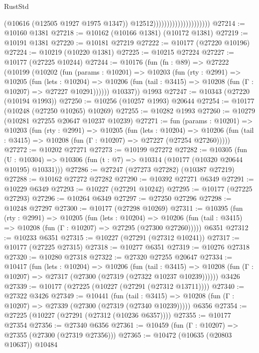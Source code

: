 \begin{lexlean}{RustStd}
\begin{coremodule}
                                              (@10616 (@12505 @1927 @1975 @1347))
                                              @12512)))))))))))))))))))))
@27214 := @10160 @1381
@27218 := @10162 (@10166 @1381) (@10172 @1381)
@27219 := @10191 @1381
@27220 := @10181 @27219
@27222 := @10177 (@27220 @10196)
@27224 := @10219 (@10220 @1381)
@27225 := @10215 @27224
@27227 := @10177 (@27225 @10244)
@27244 := @10176
    (fun (fn : @89) =>
    @27222
      (@10199
        (@10202
          (fun (params : @10201) =>
          @10203
            (fun (rty : @2991) =>
            @10205
              (fun (lets : @10204) =>
              @10206 (fun (tail : @3415) => @10208 (fun (Γ : @10207) => @27227 @10291))))))
        @10337))
    @1993
@27247 := @10343 (@27220 (@10194 @1993))
@27250 := @10256 (@10257 @1993) @20644
@27254 := @10177 (@10248 (@27250 @10265) @10269)
@27255 := @10282 @1993
@27260 := @10279 (@10281 @27255 @20647 @10237 @10239)
@27271 := fun (params : @10201) =>
  @10203
    (fun (rty : @2991) =>
    @10205
      (fun (lets : @10204) =>
      @10206 (fun (tail : @3415) => @10208 (fun (Γ : @10207) => @27227 (@27254 @27260)))))
@27272 := @10202 @27271
@27273 := @10199 @27272
@27282 := @10305
    (fun (U : @10304) => @10306 (fun (t : @7) => @10314 (@10177 (@10320 @20644 @10195) @10331)))
@27286 := @27247 (@27273 @27282) (@10387 @27219)
@27288 := @10162 @27272 @27282
@27290 := @10392 @27271 @6349
@27291 := @10229 @6349
@27293 := @10227 (@27291 @10242)
@27295 := @10177 (@27225 @27293)
@27296 := @10264 @6349
@27297 := @27250 @27296
@27298 := @10248 @27297
@27300 := @10177 (@27298 @10269)
@27311 := @10395
    (fun (rty : @2991) =>
    @10205
      (fun (lets : @10204) =>
      @10206 (fun (tail : @3415) => @10208 (fun (Γ : @10207) => @27295 (@27300 @27260)))))
    @6351
@27312 := @10233 @6351
@27315 := @10227 (@27291 (@27312 @10241))
@27317 := @10177 (@27225 @27315)
@27318 := @10277 @6351
@27319 := @10276 @27318
@27320 := @10280 @27318
@27322 := @27320 @27255 @20647
@27334 := @10417
    (fun (lets : @10204) =>
    @10206
      (fun (tail : @3415) =>
      @10208 (fun (Γ : @10207) => @27317 (@27300 (@27319 (@27322 @10237 @10239))))))
    @3426
@27339 := @10177 (@27225 (@10227 (@27291 (@27312 @13711))))
@27340 := @27322 @3426
@27349 := @10441
    (fun (tail : @3415) => @10208 (fun (Γ : @10207) => @27339 (@27300 (@27319 (@27340 @10239)))))
    @6356
@27354 := @27225 (@10227 (@27291 (@27312 (@10236 @6357))))
@27355 := @10177 @27354
@27356 := @27340 @6356
@27361 := @10459 (fun (Γ : @10207) => @27355 (@27300 (@27319 @27356)))
@27365 := @10472 (@10635 (@20803 @10637)) @10484

\end{coremodule}
\end{lexlean}
